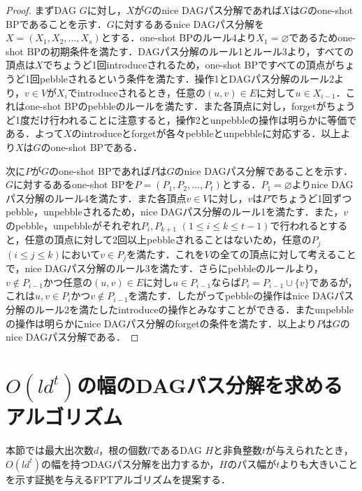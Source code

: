 \documentclass[master]{kuisthesis}		%
\theoremstyle{plain}
\theoremstyle{definition}
\begin{document}
\begin{proof}
    まずDAG $G$に対し，$X$が$G$のnice DAGパス分解であれば$X$は$G$のone-shot BPであることを示す．$G$に対するあるnice DAGパス分解を$X=(X_1, X_2, \dots, X_s)$とする．one-shot BPのルール4より$X_1 = \varnothing$であるためone-shot BPの初期条件を満たす．DAGパス分解のルール1とルール3より，すべての頂点は$X$でちょうど1回introduceされるため，one-shot BPですべての頂点がちょうど1回pebbleされるという条件を満たす．操作1とDAGパス分解のルール2より，$v \in V$が$X_i$でintroduceされるとき，任意の$(u, v)\in E$に対して$u \in X_{i-1}$．これはone-shot BPのpebbleのルールを満たす．また各頂点に対し，forgetがちょうど1度だけ行われることに注意すると，操作2とunpebbleの操作は明らかに等価である．よって$X$のintroduceとforgetが各々pebbleとunpebbleに対応する．以上より$X$は$G$のone-shot BPである．
    
    次に$P$が$G$のone-shot BPであれば$P$は$G$のnice DAGパス分解であることを示す．$G$に対するあるone-shot BPを$P=(P_1, P_2, \dots, P_t)$とする．$P_1 = \varnothing$よりnice DAGパス分解のルール4を満たす．また各頂点$v \in V$に対し，$v$は$P$でちょうど1回ずつpebble，unpebbleされるため，nice DAGパス分解のルール1を満たす．また，$v$のpebble，unpebbleがそれぞれ$P_i, P_{k+1}$ $(1 \leq i \leq k \leq t-1)$で行われるとすると，任意の頂点に対して2回以上pebbleされることはないため，任意の$P_j$ $(i \leq j \leq k)$において$v \in P_j$を満たす．これを$V$の全ての頂点に対して考えることで，nice DAGパス分解のルール3を満たす．さらにpebbleのルールより，$v \notin P_{i-1}$かつ任意の$(u, v) \in E$に対し$u \in P_{i-1}$ならば$P_i = P_{i-1} \cup \{v\}$であるが，これは$u, v \in P_i$かつ$v \notin P_{i-1}$を満たす．したがってpebbleの操作はnice DAGパス分解のルール2を満たしたintroduceの操作とみなすことができる．またunpebbleの操作は明らかにnice DAGパス分解のforgetの条件を満たす．以上より$P$は$G$のnice DAGパス分解である．
\end{proof}


















\section{$O(ld^t)$の幅のDAGパス分解を求めるアルゴリズム} %

本節では最大出次数$d$，根の個数$l$であるDAG $H$と非負整数$t$が与えられたとき，$O(ld^t)$の幅を持つDAGパス分解を出力するか，$H$のパス幅が$t$よりも大きいことを示す証拠を与えるFPTアルゴリズムを提案する．
\end{document}
